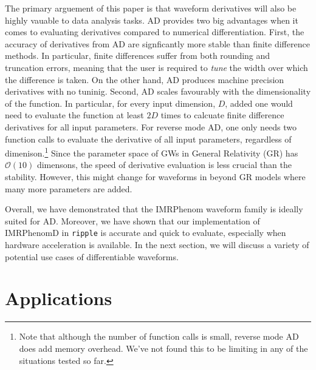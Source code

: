 \documentclass[twocolumn]{aastex631}
\newcommand{\ripple}{\texttt{ripple}\xspace}
\begin{document}
The primary arguement of this paper is that waveform derivatives will also be highly vauable to data analysis tasks. 
AD provides two big advantages when it comes to evaluating derivatives compared to numerical differentiation.
First, the accuracy of derivatives from AD are signficantly more stable than finite difference methods.
In particular, finite differences suffer from both rounding and truncation errors, meaning that the user is required to \textit{tune} the width over which the difference is taken.
On the other hand, AD produces machine precision derivatives with no tuninig.
Second, AD scales favourably with the dimensionality of the function.
In particular, for every input dimension, $D$, added one would need to evaluate the function at least $2D$ times to calcuate finite difference derivatives for all input parameters.
For reverse mode AD, one only needs two function calls to evaluate the derivative of all input parameters, regardless of dimenison.\footnote{
    Note that although the number of function calls is small, reverse mode AD does add memory overhead.
    We've not found this to be limiting in any of the situations tested so far.
}
Since the parameter space of GWs in General Relativity (GR) has $\mathcal{O}(10)$ dimensons, the speed of derivative evaluation is less crucial than the stability.
However, this might change for waveforms in beyond GR models where many more parameters are added.

Overall, we have demonstrated that the IMRPhenom waveform family is ideally suited for AD.
Moreover, we have shown that our implementation of IMRPhenomD in \ripple is accurate and quick to evaluate, especially when hardware acceleration is available.
In the next section, we will discuss a variety of potential use cases of differentiable waveforms.


\section{Applications}
\label{sec:applications}
\end{document}
